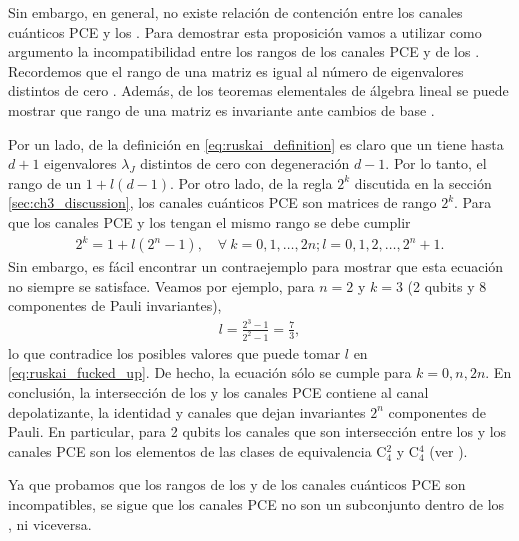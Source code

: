 Sin embargo, en general, no existe relación de contención entre los canales cuánticos PCE 
y los \ruskai{}. Para demostrar esta proposición vamos a utilizar como 
argumento la incompatibilidad entre los rangos de los canales PCE
y de los \ruskai{}. Recordemos que el rango de una matriz es igual 
al número de eigenvalores distintos de cero 
\cite{axler1997linear,lang2012introduction}.
Además, de los teoremas elementales de álgebra lineal se puede mostrar que 
rango de una matriz es invariante ante cambios de base \cite{axler1997linear}.

Por un lado, de la definición en \eqref{eq:ruskai_definition} es claro que un \ruskaiMap{}
tiene hasta $d+1$ eigenvalores $\lambda_J$ distintos de cero 
con degeneración $d-1$. Por lo tanto,
el rango de un \ruskaiMap{} $1+l(d-1)$. Por otro lado, 
de la regla $2^k$ discutida en la sección \ref{sec:ch3_discussion},
los canales cuánticos PCE son matrices de rango $2^k$. Para que los canales PCE
y los \ruskai{} tengan el mismo rango se debe cumplir 
\begin{align}\label{eq:ruskai_fucked_up}
2^k=1+l(2^n-1),\quad \forall \ k=0,1,\ldots,2n; l=0,1,2,\ldots,2^n+1.
\end{align}
Sin embargo, es fácil encontrar un contraejemplo para mostrar que esta
ecuación no siempre se satisface. Veamos por ejemplo, para $n=2$ y $k=3$
(2 qubits y 8 componentes de Pauli invariantes),
\begin{align}
l=\frac{2^3-1}{2^2-1}=\frac{7}{3},
\end{align}
lo que contradice los posibles valores que puede tomar $l$ 
en \eqref{eq:ruskai_fucked_up}. De hecho, la ecuación sólo se cumple 
para $k=0,n,2n$. En conclusión, la intersección de los \ruskai{}
y los canales PCE contiene al canal depolatizante, la identidad y canales 
que dejan invariantes $2^n$ componentes de Pauli. En particular, para 2 qubits 
los canales que son intersección entre los \ruskai{} y los canales PCE son los 
elementos de las clases de equivalencia C${}_4^2$ y C${}_4^4$
(ver ). 

Ya que probamos que los 
rangos de los \ruskai{} y de los canales cuánticos PCE son incompatibles, 
se sigue que los canales PCE no son un subconjunto dentro de los 
\ruskai{}, ni viceversa.




